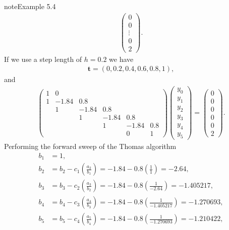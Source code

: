 \documentclass[letterpaper,10pt,english]{jupyterBook}
\begin{document}
\begin{sphinxadmonition}{note}{Example 5.4}
\begin{align*}
    \begin{pmatrix} 0 \\ 0 \\ \vdots \\ 0 \\ 2  \end{pmatrix}.
\end{align*}
\sphinxAtStartPar
If we use a step length of \(h=0.2\) we have
\begin{align*}
    \mathbf{t} = (0, 0.2, 0.4, 0.6, 0.8, 1),
\end{align*}
\sphinxAtStartPar
and
\begin{align*}
    \begin{pmatrix}
        1 & 0 \\
        1 & -1.84 & 0.8 \\
        & 1 & -1.84 & 0.8 \\
        & & 1 & -1.84 & 0.8 \\
        & & & 1 & -1.84 & 0.8 \\
        & & & & 0 & 1
    \end{pmatrix}
    \begin{pmatrix} y_0 \\ y_1 \\ y_2 \\ y_3 \\ y_4 \\ y_5 \end{pmatrix} = 
    \begin{pmatrix} 0 \\ 0 \\ 0 \\ 0 \\ 0 \\ 2 \end{pmatrix}.
\end{align*}
\sphinxAtStartPar
Performing the forward sweep of the Thomas algorithm
\begin{align*}
    b_1 &= 1, \\ 
    b_2 &= b_2 - c_1 \left( \frac{a_2}{b_1} \right) = -1.84 - 0.8 \left( \frac{1}{1} \right) = -2.64, \\
    b_3 &= b_3 - c_2 \left( \frac{a_3}{b_2} \right) = -1.84 - 0.8 \left( \frac{1}{-2.64} \right) = -1.405217, \\
    b_4 &= b_4 - c_3 \left( \frac{a_4}{b_3} \right) = -1.84 - 0.8 \left( \frac{1}{-1.405217} \right) = -1.270693, \\
    b_5 &= b_5 - c_4 \left( \frac{a_5}{b_4} \right) = -1.84 - 0.8 \left( \frac{1}{-1.270693} \right) = -1.210422, \\

\end{align*}
\end{sphinxadmonition}
\end{document}
